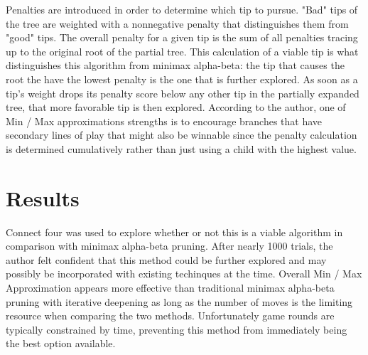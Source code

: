 \documentclass[10pt, a4paper]{article}
\begin{document}
Penalties are introduced in order to determine which tip to pursue.  "Bad" tips of the tree
are weighted with a nonnegative penalty that distinguishes them from "good" tips.
The overall penalty for a given tip is the sum of all penalties tracing up to the original root of the partial tree.
This calculation of a viable tip is what distinguishes this algorithm from minimax alpha-beta: the tip that causes
the root the have the lowest penalty is the one that is further explored. As soon as a tip's
weight drops its penalty score below any other tip in the partially expanded
tree, that more favorable tip is then explored. According to the author, one of Min / Max approximations 
strengths is to encourage branches that have secondary lines of play that might also be
winnable since the penalty calculation is determined cumulatively rather than
just using a child with the highest value.

\section{Results} 

Connect four was used to explore whether or not this is a viable algorithm in comparison
with minimax alpha-beta pruning.  After nearly 1000 trials, the author felt confident
that this method could be further explored and may possibly be incorporated with existing
techinques at the time. Overall Min / Max Approximation appears more effective than traditional 
minimax alpha-beta pruning with iterative deepening as long as the number of moves 
is the limiting resource when comparing the two methods.  Unfortunately game rounds are typically
constrained by time, preventing this method from immediately being the best option available.
\end{document}

